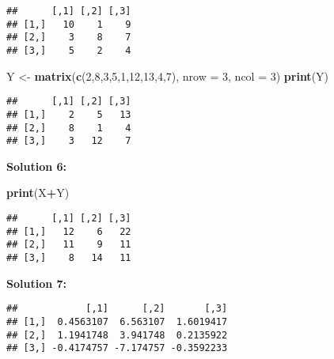 \documentclass[]{article}
\newenvironment{Shaded}{\begin{snugshade}}{\end{snugshade}}
\newcommand{\DataTypeTok}[1]{\textcolor[rgb]{0.13,0.29,0.53}{#1}}
\newcommand{\DecValTok}[1]{\textcolor[rgb]{0.00,0.00,0.81}{#1}}
\newcommand{\KeywordTok}[1]{\textcolor[rgb]{0.13,0.29,0.53}{\textbf{#1}}}
\newcommand{\NormalTok}[1]{#1}
\newcommand{\OperatorTok}[1]{\textcolor[rgb]{0.81,0.36,0.00}{\textbf{#1}}}
\newcommand{\StringTok}[1]{\textcolor[rgb]{0.31,0.60,0.02}{#1}}
\begin{document}
\begin{verbatim}
##      [,1] [,2] [,3]
## [1,]   10    1    9
## [2,]    3    8    7
## [3,]    5    2    4
\end{verbatim}

\begin{Shaded}
\begin{Highlighting}[]
\NormalTok{Y <-}\StringTok{ }\KeywordTok{matrix}\NormalTok{(}\KeywordTok{c}\NormalTok{(}\DecValTok{2}\NormalTok{,}\DecValTok{8}\NormalTok{,}\DecValTok{3}\NormalTok{,}\DecValTok{5}\NormalTok{,}\DecValTok{1}\NormalTok{,}\DecValTok{12}\NormalTok{,}\DecValTok{13}\NormalTok{,}\DecValTok{4}\NormalTok{,}\DecValTok{7}\NormalTok{), }\DataTypeTok{nrow =} \DecValTok{3}\NormalTok{, }\DataTypeTok{ncol =} \DecValTok{3}\NormalTok{)}
\KeywordTok{print}\NormalTok{(Y)}
\end{Highlighting}
\end{Shaded}

\begin{verbatim}
##      [,1] [,2] [,3]
## [1,]    2    5   13
## [2,]    8    1    4
## [3,]    3   12    7
\end{verbatim}

\textbf{Solution 6:}

\begin{Shaded}
\begin{Highlighting}[]
\KeywordTok{print}\NormalTok{(X}\OperatorTok{+}\NormalTok{Y)}
\end{Highlighting}
\end{Shaded}

\begin{verbatim}
##      [,1] [,2] [,3]
## [1,]   12    6   22
## [2,]   11    9   11
## [3,]    8   14   11
\end{verbatim}

\textbf{Solution 7:}

\begin{Shaded}
\end{Shaded}

\begin{verbatim}
##            [,1]      [,2]       [,3]
## [1,]  0.4563107  6.563107  1.6019417
## [2,]  1.1941748  3.941748  0.2135922
## [3,] -0.4174757 -7.174757 -0.3592233
\end{verbatim}
\end{document}
